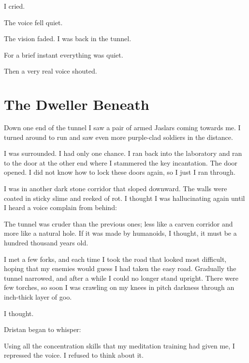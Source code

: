 \documentclass
  [a4paper,
   12pt,
   oneside
  ]%
  {article}
\begin{document}
 I cried. 

The voice fell quiet. 

The vision faded. 
I was back in the tunnel. 

For a brief instant everything was quiet.

Then a very real voice shouted. 










\section{The Dweller Beneath}
Down one end of the tunnel I saw a pair of armed Jaslars coming towards me. 
I turned around to run and saw even more purple-clad soldiers in the distance. 

I was surrounded. 
I had only one chance. 
I ran back into the laboratory and ran to the door at the other end where I stammered the key incantation. 
The door opened. 
I did not know how to lock these doors again, so I just I ran through.

I was in another dark stone corridor that sloped downward. 
The walls were coated in sticky slime and reeked of rot. 
I thought I was hallucinating again until I heard a voice complain from behind: 

The tunnel was cruder than the previous ones; less like a carven corridor and more like a natural hole. 
If it was made by humanoids, I thought, it must be a hundred thousand years old. 

I met a few forks, and each time I took the road that looked most difficult, hoping that my enemies would guess I had taken the easy road. 
Gradually the tunnel narrowed, and after a while I could no longer stand upright. 
There were few torches, so soon I was crawling on my knees in pitch darkness through an inch-thick layer of goo. 

 I thought.

Dristan began to whisper: 

Using all the concentration skills that my meditation training had given me, I repressed the voice. 
I refused to think about it. 
\end{document}
